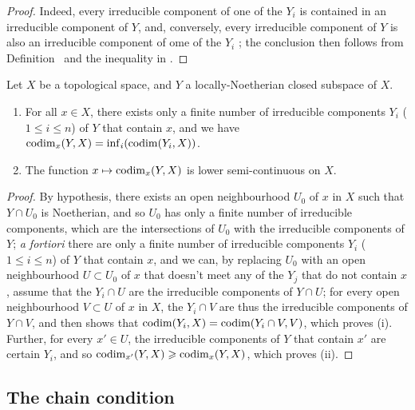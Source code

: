 \begin{proof}
\label{proof-0.14.2.5}
Indeed, every irreducible component of one of the $Y_i$ is contained in an irreducible component of $Y$, and, conversely, every irreducible component of $Y$ is also an irreducible component of ome of the $Y_i$ ;
the conclusion then follows from Definition~ and the inequality in .
\end{proof}

\begin{cor}
\label{0.14.2.6}
Let $X$ be a topological space, and $Y$ a locally-Noetherian closed subspace of $X$.
\begin{enumerate}[label=\emph{(\roman*)}]
    \item For all $x\in X$, there exists only a finite number of irreducible components $Y_i$ ($1\leq i\leq n$) of $Y$ that contain $x$, and we have ${\mathop{\mathrm{codim}}\nolimits}_x(Y,X)=\inf_i({\mathop{\mathrm{codim}}\nolimits}(Y_i,X))$.
    \item The function $x\mapsto\codim_x(Y,X)$ is lower semi-continuous on $X$.
\end{enumerate}
\end{cor}

\begin{proof}
\label{proof-0.14.2.6}
By hypothesis, there exists an open neighbourhood $U_0$ of $x$ in $X$ such that $Y\cap U_0$ is Noetherian, and so $U_0$ has only a finite number of irreducible components, which are the intersections of $U_0$ with the irreducible components of $Y$;
\emph{a fortiori} there are only a finite number of irreducible components $Y_i$ ($1\leq i\leq n$) of $Y$ that contain $x$, and we can, by replacing $U_0$ with an open neighbourhood $U\subset U_0$ of $x$ that doesn't meet any of the $Y_j$ that do not contain $x$, assume that the $Y_i\cap U$ are the irreducible components of $Y\cap U$;
for every open neighbourhood $V\subset U$ of $x$ in $X$, the $Y_i\cap V$ are thus the irreducible components of $Y\cap V$, and  then shows that ${\mathop{\mathrm{codim}}\nolimits}(Y_i,X)={\mathop{\mathrm{codim}}\nolimits}(Y_i\cap V,V)$, which proves (i).
Further, for every $x'\in U$, the irreducible components of $Y$ that contain $x'$ are certain $Y_i$, and so ${\mathop{\mathrm{codim}}\nolimits}_{x'}(Y,X)\geqslant{\mathop{\mathrm{codim}}\nolimits}_x(Y,X)$, which proves (ii).
\end{proof}

\subsection{The chain condition}
\label{subsection:the-chain-condition}

